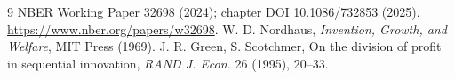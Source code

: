 \documentclass[11pt]{article}
\theoremstyle{definition}
\begin{document}
\begin{thebibliography}{9}
 NBER Working Paper 32698 (2024); chapter DOI 10.1086/732853 (2025). \url{https://www.nber.org/papers/w32698}.
 W. D. Nordhaus, \emph{Invention, Growth, and Welfare}, MIT Press (1969).
 J. R. Green, S. Scotchmer, On the division of profit in sequential innovation, \emph{RAND J. Econ.} 26 (1995), 20--33.
\end{thebibliography}
\end{document}
